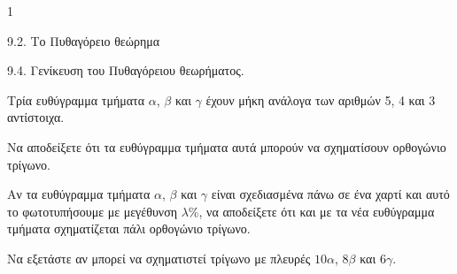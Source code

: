 \begin{ylh}{1}
    \item 9.2. Το Πυθαγόρειο θεώρημα
    \item 9.4. Γενίκευση του Πυθαγόρειου θεωρήματος.
\end{ylh}
Τρία ευθύγραμμα τμήματα $\alpha$, $\beta$ και $\gamma$ έχουν μήκη ανάλογα των αριθμών 5, 4 και 3 αντίστοιχα.
\begin{alist}
\item Να αποδείξετε ότι τα ευθύγραμμα τμήματα αυτά μπορούν να σχηματίσουν ορθογώνιο τρίγωνο. 
\item Αν τα ευθύγραμμα τμήματα $\alpha$, $\beta$ και $\gamma$ είναι σχεδιασμένα πάνω σε ένα χαρτί και αυτό το φωτοτυπήσουμε με μεγέθυνση $\lambda$\%, να αποδείξετε ότι και με τα νέα ευθύγραμμα τμήματα σχηματίζεται πάλι ορθογώνιο τρίγωνο. 
\item Να εξετάστε αν μπορεί να σχηματιστεί τρίγωνο με πλευρές $10\alpha$, $8\beta$ και $6\gamma$. 
\end{alist}